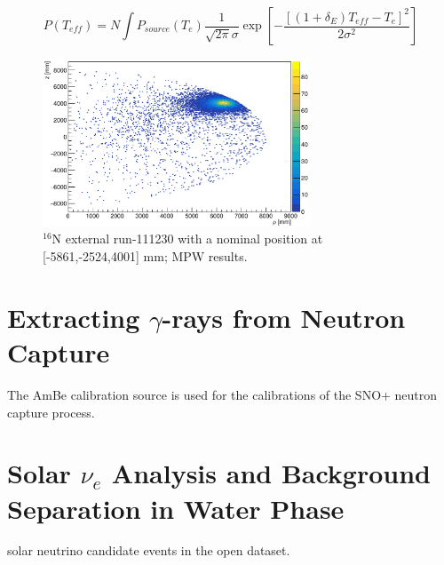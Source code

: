 \begin{equation}
P(T_{eff})=N\int P_{source}(T_e)\frac{1}{\sqrt{2\pi}\sigma}\exp [-\frac{[(1+\delta_E)T_{eff}-T_e]^2}{2\sigma^2}]
\end{equation}







\begin{figure}[!htb]
	\centering
	\includegraphics[width=8cm]{N16_external_111230_rhoZ.png}
	\caption{$^{16}$N external run-111230 with a nominal position at [-5861,-2524,4001] mm; MPW results.}
	\label{16Nexternal}
\end{figure}


\section{Extracting \texorpdfstring{$\gamma$}{Lg}-rays from Neutron Capture}
The AmBe calibration source is used for the calibrations of the SNO+ neutron capture process.


\section{Solar \texorpdfstring{$\nu_e$}{Lg} Analysis and Background Separation in Water Phase}


solar neutrino candidate events in the open dataset.


